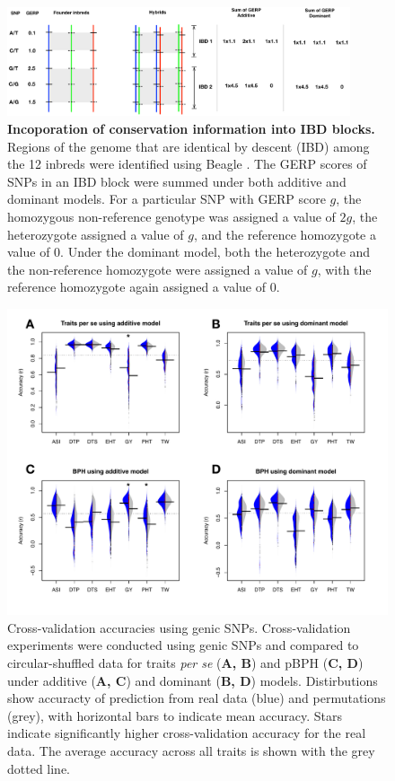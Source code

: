 \documentclass[9pt,twocolumn,twoside]{gsajnl}
\begin{document}
\DIFdelbegin \DIFdelend \DIFaddbegin \begin{figure}[htbp]
\DIFaddendFL \includegraphics[width=0.9\textwidth]{SFig_gerpIBD.pdf}
\caption{
\textbf{Incoporation of conservation information into IBD blocks.}
Regions of the genome that are identical by descent (IBD) among the 12 inbreds were identified using Beagle \citep{Browning2009}.  The GERP scores of SNPs in an IBD block were summed under both additive and dominant models. For a particular SNP with GERP score $g$, the homozygous non-reference genotype was assigned a value of $2g$, the heterozygote assigned a value of $g$, and the reference homozygote a value of 0.  Under the dominant model, both the heterozygote and the non-reference homozygote were assigned a value of $g$, with the reference homozygote again assigned a value of 0.}
\label{fig:gerpibd}
\end{figure}

\begin{figure}[htbp]
\centering
\DIFdelbeginFL \DIFdelendFL \DIFaddbeginFL \includegraphics[width=\linewidth]{SFig_genicsnp_m.pdf}
\DIFaddendFL \caption{Cross-validation accuracies using genic SNPs. Cross-validation experiments were conducted using genic SNPs and compared to circular-shuffled data for traits \emph{per se} (\textbf{A, B}) and pBPH (\textbf{C, D}) under additive (\textbf{A, C}) and dominant (\textbf{B, D}) models. Distirbutions show accuracty of prediction from real data (blue) and permutations (grey), with horizontal bars to indicate mean accuracy.  Stars indicate significantly higher cross-validation accuracy for the real data.  The average accuracy across all traits is shown with the grey dotted line. }
\label{fig:genicsnp}
\end{figure}
\end{document}
